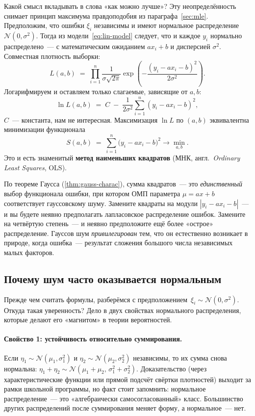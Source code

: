Какой смысл вкладывать в слова «как можно лучше»? Эту неопределённость
снимает принцип максимума правдоподобия из
параграфа~\ref{sec:mle}. Предположим, что ошибки $\xi_i$ независимы и
имеют нормальное распределение $\mathcal N(0,\sigma^{2})$. Тогда из
модели~\eqref{eq:lin-model} следует, что и каждое $y_i$ нормально
распределено~--- с математическим ожиданием $a x_i+b$ и дисперсией
$\sigma^{2}$. Совместная плотность выборки:
\[
L(a,b)\;=\;\prod_{i=1}^{n}\frac{1}{\sigma\sqrt{2\pi}}
\exp\!\left(-\frac{(y_i-a x_i-b)^{2}}{2\sigma^{2}}\right).
\]
Логарифмируем и оставляем только слагаемые, зависящие от $a,b$:
\begin{equation}\label{eq:ols-loglike}
\ln L(a,b)\;=\;C\;-\;\frac{1}{2\sigma^{2}}\sum_{i=1}^{n}(y_i-ax_i-b)^{2},
\end{equation}
$C$~--- константа, нам не интересная. Максимизация $\ln L$ по $(a,b)$
эквивалентна минимизации функционала
\begin{equation}\label{eq:ols-func}
\boxed{\;\;S(a,b)\;=\;\sum_{i=1}^{n}\bigl(y_i-a x_i-b\bigr)^{2}\longrightarrow\min_{a,b}.\;\;}
\end{equation}
Это и есть знаменитый \textbf{метод наименьших квадратов} (МНК,
англ.\ \emph{Ordinary Least Squares}, OLS).

\begin{notebox}[title={Почему именно квадраты?}]
По теореме Гаусса (\cref{thm:gauss-charac}), сумма квадратов~--- это
\emph{единственный} выбор функционала ошибки, при котором ОМП
параметра $\mu=a x+b$ соответствует гауссовскому шуму. Замените
квадраты на модули $|y_i-ax_i-b|$~--- и вы будете неявно предполагать
лапласовское распределение ошибок. Замените на четвёртую степень~--- и
неявно предположите ещё более «острое» распределение. Гауссов шум
\emph{привилегирован} тем, что он естественно возникает в природе,
когда ошибка~--- результат сложения большого числа независимых малых
факторов.
\end{notebox}

\subsection{Почему шум часто оказывается нормальным}
\label{ssec:why-gauss}

Прежде чем считать формулы, разберёмся с предположением~$\xi_i\sim
\mathcal N(0,\sigma^{2})$. Откуда такая уверенность? Дело в двух
свойствах нормального распределения, которые делают его «магнитом» в
теории вероятностей.

\paragraph{Свойство 1: устойчивость относительно суммирования.}
Если $\eta_1\sim\mathcal N(\mu_1,\sigma_1^{2})$ и
$\eta_2\sim\mathcal N(\mu_2,\sigma_2^{2})$ независимы, то их сумма снова
нормальна: $\eta_1+\eta_2\sim\mathcal N(\mu_1+\mu_2,\,\sigma_1^{2}+\sigma_2^{2})$.
Доказательство (через характеристические функции или прямой подсчёт
свёртки плотностей) выходит за рамки школьной программы, но факт стоит
запомнить: нормальное распределение~--- это «алгебраически
самосогласованный» класс. Большинство других распределений после
суммирования меняет форму, а нормальное~--- нет.

